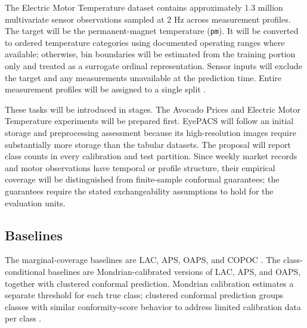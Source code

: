 \documentclass[12pt]{report}
\begin{document}
The Electric Motor Temperature dataset contains approximately 1.3 million multivariate sensor observations sampled at 2 Hz across measurement profiles. The target will be the permanent-magnet temperature (\texttt{pm}). It will be converted to ordered temperature categories using documented operating ranges where available; otherwise, bin boundaries will be estimated from the training portion only and treated as a surrogate ordinal representation. Sensor inputs will exclude the target and any measurements unavailable at the prediction time. Entire measurement profiles will be assigned to a single split \citep{kirchgassner2021benchmark,zhang2026mincps}.

These tasks will be introduced in stages. The Avocado Prices and Electric Motor Temperature experiments will be prepared first. EyePACS will follow an initial storage and preprocessing assessment because its high-resolution images require substantially more storage than the tabular datasets. The proposal will report class counts in every calibration and test partition. Since weekly market records and motor observations have temporal or profile structure, their empirical coverage will be distinguished from finite-sample conformal guarantees; the guarantees require the stated exchangeability assumptions to hold for the evaluation units.

\subsection{Baselines}

The marginal-coverage baselines are LAC, APS, OAPS, and COPOC \citep{sadinle2019least,angelopoulos2020uncertainty,romano2020classification,lu2022ordinalaps,dey2023copoc}. The class-conditional baselines are Mondrian-calibrated versions of LAC, APS, and OAPS, together with clustered conformal prediction. Mondrian calibration estimates a separate threshold for each true class; clustered conformal prediction groups classes with similar conformity-score behavior to address limited calibration data per class \citep{vovk2005algorithmic,vovk2012conditional,ding2023classconditional}.
\end{document}
